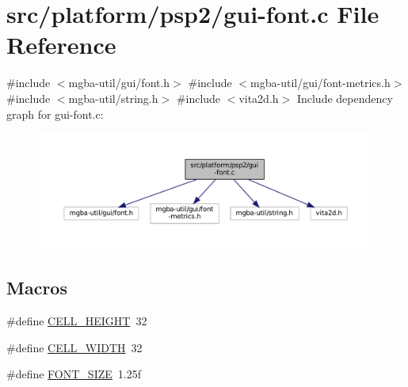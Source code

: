 \hypertarget{psp2_2gui-font_8c}{}\section{src/platform/psp2/gui-\/font.c File Reference}
\label{psp2_2gui-font_8c}
{\ttfamily \#include $<$mgba-\/util/gui/font.\+h$>$}\newline
{\ttfamily \#include $<$mgba-\/util/gui/font-\/metrics.\+h$>$}\newline
{\ttfamily \#include $<$mgba-\/util/string.\+h$>$}\newline
{\ttfamily \#include $<$vita2d.\+h$>$}\newline
Include dependency graph for gui-\/font.c\+:
\nopagebreak
\begin{figure}[H]
\begin{center}
\leavevmode
\includegraphics[width=350pt]{psp2_2gui-font_8c__incl}
\end{center}
\end{figure}
\subsection*{Macros}
\begin{DoxyCompactItemize}
\item 
\#define \mbox{\hyperlink{psp2_2gui-font_8c_a8519cbc2997bb2eb21cf5571b37b38bd}{C\+E\+L\+L\+\_\+\+H\+E\+I\+G\+HT}}~32
\item 
\#define \mbox{\hyperlink{psp2_2gui-font_8c_ae1dbb0e959fde337fa4e436b61bb2bac}{C\+E\+L\+L\+\_\+\+W\+I\+D\+TH}}~32
\item 
\#define \mbox{\hyperlink{psp2_2gui-font_8c_aa968a61524f9ed159c4c5464cb26dd41}{F\+O\+N\+T\+\_\+\+S\+I\+ZE}}~1.\+25f
\end{DoxyCompactItemize}
